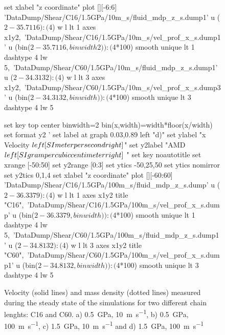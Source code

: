 \documentclass[5p]{elsarticle}
\begin{document}
\begin{figure}[htp]
\begin{center}
\begin{gnuplot}[terminal=epslatex, terminaloptions={size \SERFigwidth cm, \SERFigheight cm color solid}]
			set xlabel "z coordinate"  
			plot  	[][-6:6]  'DataDump/Shear/C16/1.5GPa/10m_s/fluid_mdp_z_s.dump1' u ($2-35.7116):($4) w l  lt 1 axes x1y2,\ 								
				              'DataDump/Shear/C16/1.5GPa/10m_s/vel_prof_x_s.dump1'  u (bin($2-35.7116,binwidth2)):($4*100) smooth unique lt 1 dashtype 4  lw 5,\	
                             		    'DataDump/Shear/C60/1.5GPa/10m_s/fluid_mdp_z_s.dump1' u ($2-34.3132):($4) w l  lt 3  axes x1y2,\ 								
				              'DataDump/Shear/C60/1.5GPa/10m_s/vel_prof_x_s.dump3'  u (bin($2-34.3132,binwidth)):($4*100) smooth unique lt 3 dashtype 4  lw 5		
		\end{gnuplot}
		\begin{gnuplot}[terminal=epslatex, terminaloptions={size \SERFigwidth cm, \SERFigheight cm color solid}]
		set key top center
			binwidth=2
			bin(x,width)=width*floor(x/width)
			set format y2 '%
			set label at graph 0.03,0.89 left "d)"
			set ylabel "x Velocity $\\left[ \\SI{}{\\meter\\per\\second} \\right]$"
			set y2label "AMD $\\left[ \\SI{}{\\gram\\per\\cubic\\centi\\meter} \\right]$ "
			set key noautotitle
			set xrange [-50:50]
			set y2range [0:3]
			set ytics  -50,25,50
			set ytics nomirror
			set y2tics 0,1,4
			set xlabel "z coordinate"  
			plot  	[][-60:60]  'DataDump/Shear/C16/1.5GPa/100m_s/fluid_mdp_z_s.dump' u ($2-36.3379):($4) w l  lt 1 axes x1y2 title "C16",\ 						
				              'DataDump/Shear/C16/1.5GPa/100m_s/vel_prof_x_s.dump'  u (bin($2-36.3379,binwidth)):($4*100) smooth unique lt 1 dashtype 4  lw 5,\ 
                             		     'DataDump/Shear/C60/1.5GPa/100m_s/fluid_mdp_z_s.dump1' u ($2-34.8132):($4) w l  lt 3  axes x1y2 title "C60",\ 						
				              'DataDump/Shear/C60/1.5GPa/100m_s/vel_prof_x_s.dump1'  u (bin($2-34.8132,binwidth)):($4*100) smooth unique lt 3 dashtype 4  lw 5 	
		\end{gnuplot}
		
		\caption{Velocity (solid lines) and mass density (dotted lines) measured during the steady state of the simulations for two different chain lenghts: C16 and C60. a) \SI{0.5}{\giga\pascal},  \SI{10}{\meter\per\second},   b) \SI{0.5}{\giga\pascal},  \SI{100}{\meter\per\second}, c) \SI{1.5}{\giga\pascal},  \SI{10}{\meter\per\second} and    d) \SI{1.5}{\giga\pascal},  \SI{100}{\meter\per\second}} 
		\label{fig:VelProf_MDP2}
	\end{center}
 \end{figure}
\end{document}
